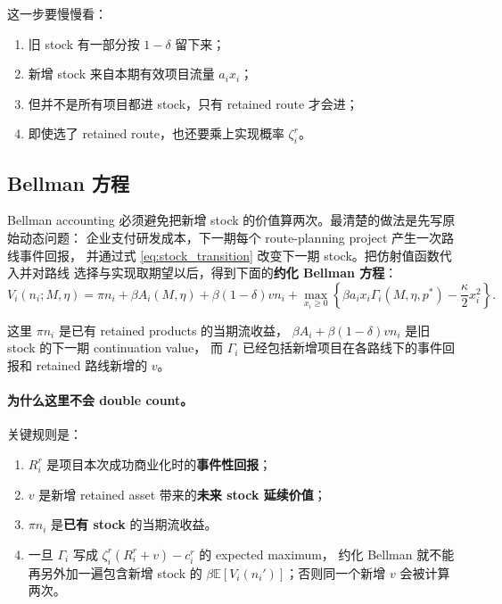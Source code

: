 \documentclass[12pt,UTF8]{ctexart}
\newcommand{\E}{\mathbb{E}}
\theoremstyle{plain}
\theoremstyle{remark}
\begin{document}
这一步要慢慢看：

\begin{enumerate}[leftmargin=2em]
    \item 旧 stock 有一部分按 $1-\delta$ 留下来；
    \item 新增 stock 来自本期有效项目流量 $a_i x_i$；
    \item 但并不是所有项目都进 stock，只有 retained route 才会进；
    \item 即使选了 retained route，也还要乘上实现概率 $\zeta_i^r$。
\end{enumerate}

\subsection{Bellman 方程}

Bellman accounting 必须避免把新增 stock 的价值算两次。最清楚的做法是先写原始动态问题：
企业支付研发成本，下一期每个 route-planning project 产生一次路线事件回报，
并通过式 \eqref{eq:stock_transition} 改变下一期 stock。把仿射值函数代入并对路线
选择与实现取期望以后，得到下面的\textbf{约化 Bellman 方程}：
\begin{equation}
V_i(n_i;M,\eta)
=
\pi n_i
+\beta A_i(M,\eta)
+\beta(1-\delta)v n_i
+\max_{x_i\ge 0}\left\{
\beta a_i x_i\Gamma_i(M,\eta,p^*)
-\frac{\kappa}{2}x_i^2
\right\}.
\label{eq:bellman}
\end{equation}

这里 $\pi n_i$ 是已有 retained products 的当期流收益，
$\beta A_i+\beta(1-\delta)vn_i$ 是旧 stock 的下一期 continuation value，
而 $\Gamma_i$ 已经包括新增项目在各路线下的事件回报和 retained 路线新增的 $v$。

\paragraph{为什么这里不会 double count。}
关键规则是：

\begin{enumerate}[leftmargin=2em]
    \item $R_i^r$ 是项目本次成功商业化时的\textbf{事件性回报}；
    \item $v$ 是新增 retained asset 带来的\textbf{未来 stock 延续价值}；
    \item $\pi n_i$ 是\textbf{已有 stock} 的当期流收益。
    \item 一旦 $\Gamma_i$ 写成 $\zeta_i^r(R_i^r+v)-c_i^r$ 的 expected maximum，
    约化 Bellman 就不能再另外加一遍包含新增 stock 的
    $\beta\E[V_i(n_i')]$；否则同一个新增 $v$ 会被计算两次。
\end{enumerate}
\end{document}
